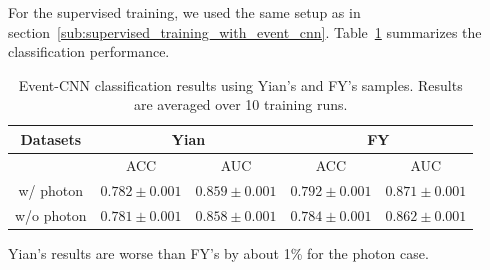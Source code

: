 \documentclass[12pt]{article}
\begin{document}
    For the supervised training, we used the same setup as in section~\ref{sub:supervised_training_with_event_cnn}. Table~\ref{tab:supervised_event_CNN_training_results_diphoton_w_wo_photon_yian_sample} summarizes the classification performance. 
    \begin{table}[htpb]
        \centering
        \caption{Event-CNN classification results using Yian's and FY's samples. Results are averaged over 10 training runs.}
        \label{tab:supervised_event_CNN_training_results_diphoton_w_wo_photon_yian_sample}
        \begin{tabular}{c|cc|cc}
            Datasets   & \multicolumn{2}{c|}{Yian}             & \multicolumn{2}{c}{FY}                \\ \hline
                       & ACC               & AUC               & ACC               & AUC               \\ \hline
            w/ photon  & $0.782 \pm 0.001$ & $0.859 \pm 0.001$ & $0.792 \pm 0.001$ & $0.871 \pm 0.001$ \\
            w/o photon & $0.781 \pm 0.001$ & $0.858 \pm 0.001$ & $0.784 \pm 0.001$ & $0.862 \pm 0.001$
        \end{tabular}
    \end{table}
    Yian's results are worse than FY's by about 1\% for the photon case.
\end{document}

